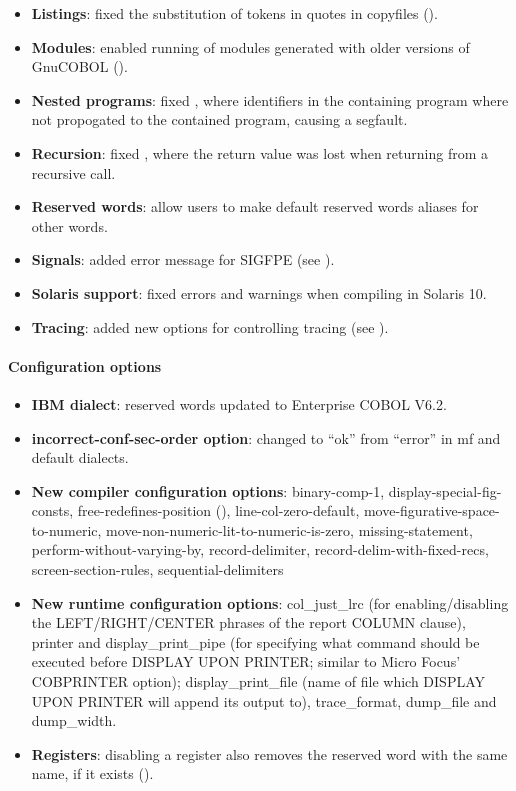 \begin{itemize}
\item \textbf{Listings}: fixed the substitution of tokens in quotes in copyfiles ().
\item \textbf{Modules}: enabled running of modules generated with older versions of GnuCOBOL ().
\item \textbf{Nested programs}: fixed , where identifiers in the containing program where not propogated to the contained program, causing a segfault.
\item \textbf{Recursion}: fixed , where the return value was lost when returning from a recursive call.
\item \textbf{Reserved words}: allow users to make default reserved words aliases for other words.
\item \textbf{Signals}: added error message for SIGFPE (see ).
\item \textbf{Solaris support}: fixed errors and warnings when compiling in Solaris 10.
\item \textbf{Tracing}: added new options for controlling tracing (see ).
\end{itemize}

\paragraph{Configuration options}
\begin{itemize}
\item \textbf{IBM dialect}: reserved words updated to Enterprise COBOL V6.2.
\item \textbf{incorrect-conf-sec-order option}: changed to ``ok'' from ``error'' in mf and default dialects.
\item \textbf{New compiler configuration options}: binary-comp-1, display-special-fig-consts, free-redefines-position (), line-col-zero-default, move-figurative-space-to-numeric, move-non-numeric-lit-to-numeric-is-zero, missing-statement, perform-without-varying-by, record-delimiter, record-delim-with-fixed-recs, screen-section-rules, sequential-delimiters
\item \textbf{New runtime configuration options}: col\_just\_lrc (for enabling\slash{}disabling the LEFT\slash{}RIGHT\slash{}CENTER phrases of the report COLUMN clause), printer and display\_print\_pipe (for specifying what command should be executed before DISPLAY UPON PRINTER; similar to Micro Focus' COBPRINTER option); display\_print\_file (name of file which DISPLAY UPON PRINTER will append its output to), trace\_format, dump\_file and dump\_width.
\item \textbf{Registers}: disabling a register also removes the reserved word with the same name, if it exists ().
\end{itemize}

